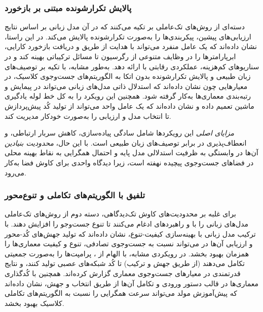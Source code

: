 \subsubsection{پالایش تکرارشونده مبتنی بر بازخورد}
دسته‌ای از روش‌های تک‌عاملی بر  تکیه می‌کنند که در آن مدل زبانی بر اساس نتایج ارزیابی‌های پیشین، پیکربندی‌ها را به‌صورت تکرارشونده پالایش می‌کند. در این راستا، \cite{zhang2023usingLLMforHPO} نشان داده‌اند که یک عامل منفرد می‌تواند با هدایت از طریق  و دریافت بازخورد کارایی، ابرپارامترها را در وظایف متنوعی از رگرسیون تا مسائل ترکیباتی بهینه کند و در سناریوهای کم‌هزینه، عملکردی رقابتی با  ارائه دهد. به‌طور مشابه، \cite{zheng2023GENIUS} با تکیه بر توصیف‌های زبان طبیعی و پالایش تکرارشونده بدون اتکا به الگوریتم‌های جست‌وجوی کلاسیک، در معیارهایی چون  نشان داده‌اند که استدلال ذاتی مدل‌های زبانی می‌تواند در پیمایش و رتبه‌بندی معماری‌ها به‌کار گرفته شود. همچنین \cite{zhang2023AutomlGPTAutomaticMachineLearning} این رویکرد را به کل خط لوله یادگیری ماشین تعمیم داده و نشان داده‌اند که یک عامل واحد می‌تواند از تولید کُد پیش‌پردازش تا انتخاب مدل و ارزیابی را به‌صورت خودکار مدیریت کند.

\emph{مزایای اصلی} این رویکردها شامل سادگی پیاده‌سازی، کاهش سربار ارتباطی، و انعطاف‌پذیری در برابر توصیف‌های زبان طبیعی است. با این حال، \emph{محدودیت بنیادین} آن‌ها در وابستگی به ظرفیت استدلالی مدل پایه و احتمال همگرایی به نقاط بهینه محلی در فضاهای جست‌وجوی پیچیده نهفته است، زیرا دیدگاه واحدی برای کاوش فضا به‌کار می‌رود.

\subsubsection{تلفیق با الگوریتم‌های تکاملی و تنوع‌محور}
برای غلبه بر محدودیت‌های کاوش تک‌دیدگاهی، دسته دوم از روش‌های تک‌عاملی مدل‌های زبانی را با  و راهبردهای  ادغام می‌کنند تا تنوع جست‌وجو را افزایش دهند. \cite{LLMatic2024} با ترکیب مدل زبانی با بهینه‌سازی کیفیت-تنوع، نشان داده‌اند که تولید جهش‌های کُد-محور و ارزیابی آن‌ها در  می‌تواند نسبت به جست‌وجوی تصادفی، تنوع و کیفیت معماری‌ها را همزمان بهبود بخشد. در رویکردی مشابه، \cite{chen2023Evoprompting} با الهام از ، پرامپت‌ها را به‌صورت جمعیتی تکامل می‌دهند (از طریق جهش و ترکیب) تا کُد شبکه‌های عصبی تولید کنند، و نتایج قدرتمندی در معیارهای جست‌وجوی معماری گزارش کرده‌اند. همچنین \cite{Yu2025GPTNAS} با کُدگذاری معماری‌ها در قالب دستور ورودی و تکامل آن‌ها از طریق انتخاب و جهش، نشان داده‌اند که پیش‌آموزش مولد می‌تواند سرعت همگرایی را نسبت به الگوریتم‌های تکاملی کلاسیک بهبود بخشد.

